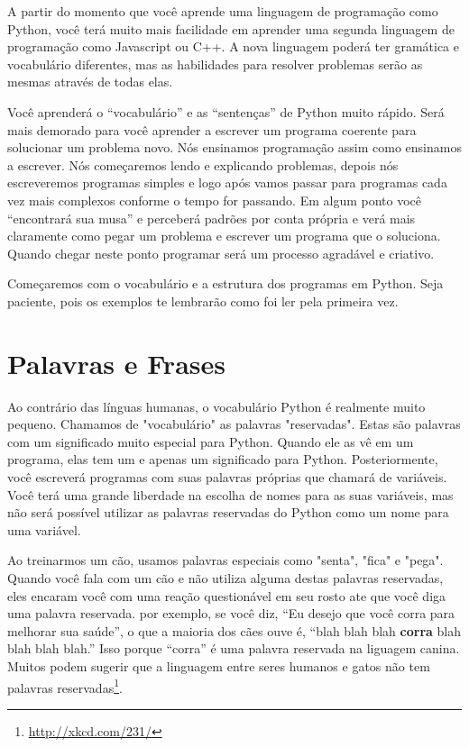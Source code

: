 A partir do momento que você aprende uma linguagem de programação como Python, você terá muito mais facilidade em aprender uma segunda linguagem de programação como Javascript ou C++. A nova linguagem poderá ter gramática e vocabulário diferentes, mas as habilidades para resolver problemas serão as mesmas através de todas elas.

Você aprenderá o ``vocabulário'' e as ``sentenças'' de Python muito rápido. Será mais demorado para você aprender a escrever um programa coerente para solucionar um problema novo. Nós ensinamos programação assim como ensinamos a escrever. Nós começaremos lendo e explicando problemas, depois nós escreveremos programas simples e logo após vamos passar para programas cada vez mais complexos conforme o tempo for passando. Em algum ponto você ``encontrará sua musa'' e perceberá padrões por conta própria e verá mais claramente como pegar um problema e escrever um programa que o soluciona. Quando chegar neste ponto programar será um processo agradável e criativo.

Começaremos com o vocabulário e a estrutura dos programas em Python. Seja paciente, pois os exemplos te lembrarão como foi ler pela primeira vez.

\section{Palavras e Frases } %

Ao contrário das línguas humanas, o vocabulário Python é realmente muito pequeno.
Chamamos de "vocabulário" as palavras "reservadas". Estas são palavras com um significado muito especial para Python. Quando ele as vê em um programa, elas tem um e apenas um significado para Python. Posteriormente, você escreverá programas com suas palavras próprias que chamará de variáveis. Você terá uma grande liberdade na escolha de nomes para as suas variáveis, mas não será possível utilizar as palavras reservadas do Python como um nome para uma variável.

Ao treinarmos um cão, usamos palavras especiais como "senta", "fica" e "pega". Quando você fala com um cão e não utiliza alguma destas palavras reservadas, eles encaram você com uma reação questionável em seu rosto ate que você diga uma palavra reservada.  
por exemplo, se você diz, 
``Eu desejo que você corra para melhorar sua saúde'', 
o que a maioria dos cães ouve é,
``blah blah blah {\bf corra} blah blah blah blah.''
Isso porque ``corra'' é uma palavra reservada na liguagem canina. Muitos podem sugerir que a linguagem entre seres humanos e gatos não tem palavras reservadas\footnote{\url{http://xkcd.com/231/}}.

